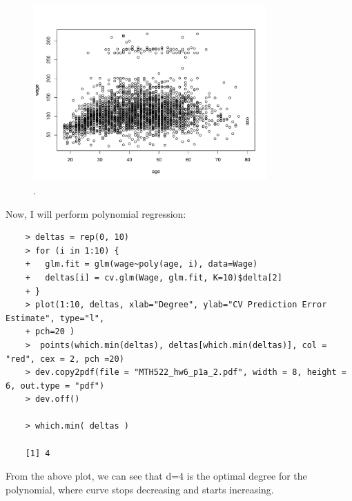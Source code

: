 \documentclass{article}
\begin{document}
\newpage

\begin{figure}[htb]
	\begin{center}
		\includegraphics[width=0.8\textwidth]{MTH522_hw6_p1a_1.pdf}
	\end{center}
	\caption{.}
	\label{fig:MTH522_hw6_p1a_1}
\end{figure}

\newpage

Now, I will perform polynomial regression:

\begin{program}
	\begin{verbatim}
	> deltas = rep(0, 10)
	> for (i in 1:10) {
	+   glm.fit = glm(wage~poly(age, i), data=Wage)
	+   deltas[i] = cv.glm(Wage, glm.fit, K=10)$delta[2]
	+ }
	> plot(1:10, deltas, xlab="Degree", ylab="CV Prediction Error Estimate", type="l",
	+ pch=20 )
	>  points(which.min(deltas), deltas[which.min(deltas)], col = "red", cex = 2, pch =20)
	> dev.copy2pdf(file = "MTH522_hw6_p1a_2.pdf", width = 8, height = 6, out.type = "pdf") 
	> dev.off()

	> which.min( deltas )
	
	[1] 4
	\end{verbatim}
\end{program}
From the above plot, we can see that d=4 is the optimal degree for the polynomial, where curve stops decreasing and starts increasing.
\end{document}
